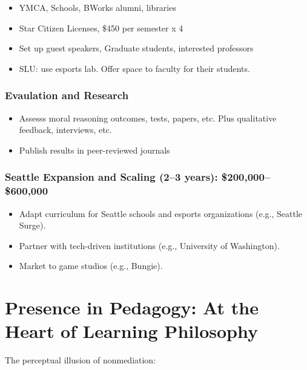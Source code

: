 \documentclass[
  letterpaper,
  DIV=11,
  numbers=noendperiod]{scrreprt}
\providecommand{\tightlist}{%
  \setlength{\itemsep}{0pt}\setlength{\parskip}{0pt}}\usepackage{longtable,booktabs,array}
\begin{document}
\begin{tcolorbox}[enhanced jigsaw, arc=.35mm, breakable, rightrule=.15mm, colback=white, colframe=quarto-callout-important-color-frame, bottomrule=.15mm, leftrule=.75mm, opacityback=0, toprule=.15mm, left=2mm]
\begin{tcolorbox}[enhanced jigsaw, arc=.35mm, breakable, rightrule=.15mm, colback=white, colframe=quarto-callout-tip-color-frame, bottomrule=.15mm, leftrule=.75mm, opacityback=0, toprule=.15mm, left=2mm]
\begin{itemize}
  \begin{itemize}
  \tightlist
  \item
    YMCA, Schools, BWorks alumni, libraries
  \item
    Star Citizen Licenses, \$450 per semester x 4
  \item
    Set up guest speakers, Graduate students, interested professors
  \item
    SLU: use esports lab. Offer space to faculty for their students.
  \end{itemize}
\end{itemize}

\subsection{Evaulation and Research}\label{evaulation-and-research}

\begin{itemize}
\tightlist
\item
  Assesss moral reasoning outcomes, tests, papers, etc. Plus qualitative
  feedback, interviews, etc.
\item
  Publish results in peer-reviewed journals
\end{itemize}

\subsection{Seattle Expansion and Scaling (2--3 years):
\$200,000--\$600,000}\label{seattle-expansion-and-scaling-23-years-200000600000}

\begin{itemize}
\tightlist
\item
  Adapt curriculum for Seattle schools and esports organizations (e.g.,
  Seattle Surge).
\item
  Partner with tech-driven institutions (e.g., University of
  Washington).
\item
  Market to game studios (e.g., Bungie).
\end{itemize}

\chapter{Presence in Pedagogy: At the Heart of Learning
Philosophy}\label{presence-in-pedagogy-at-the-heart-of-learning-philosophy}

The perceptual illusion of nonmediation:


\end{tcolorbox}
\end{tcolorbox}
\end{document}
